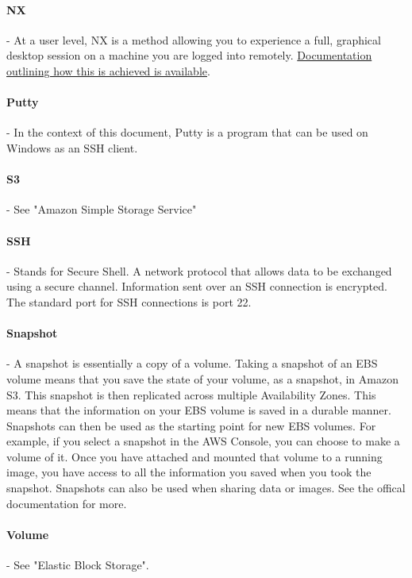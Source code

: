 \paragraph{NX} - At a user level, NX is a method allowing you to experience a full, graphical desktop session on a machine you are logged into remotely. \href{http://en.wikipedia.org/wiki/NX_technology}{Documentation outlining how this is achieved is available}.

\paragraph{Putty} - In the context of this document, Putty is a program that can be used on Windows as an SSH client.

\paragraph{S3} - See "Amazon Simple Storage Service"   

\paragraph{SSH} - Stands for Secure Shell. A network protocol that allows data to be exchanged using a secure channel. Information sent over an SSH connection is encrypted. The standard port for SSH connections is port 22.

\paragraph{Snapshot} - A snapshot is essentially a copy of a volume. Taking a snapshot of an EBS volume means that you save the state of your volume, as a snapshot, in Amazon S3. This snapshot is then replicated across multiple Availability Zones. This means that the information on your EBS volume is saved in a durable manner. Snapshots can then be used as the starting point for new EBS volumes. For example, if you select a snapshot in the AWS Console, you can choose to make a volume of it. Once you have attached and mounted that volume to a running image, you have access to all the information you saved when you took the snapshot. Snapshots can also be used when sharing data or images. See the offical documentation for more. 

\paragraph{Volume} - See "Elastic Block Storage".




